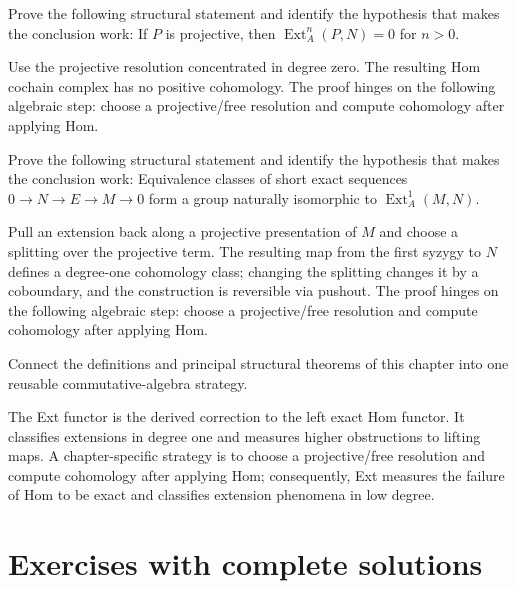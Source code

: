 \begin{problem}\label{prob:v27-problem-10}
Prove the following structural statement and identify the hypothesis that makes the conclusion work: If $P$ is projective, then $\operatorname{Ext}_A^n(P,N)=0$ for $n>0$.
\end{problem}
\begin{solution}
Use the projective resolution concentrated in degree zero. The resulting Hom cochain complex has no positive cohomology. The proof hinges on the following algebraic step: choose a projective/free resolution and compute cohomology after applying Hom.
\end{solution}

\begin{problem}\label{prob:v27-problem-11}
Prove the following structural statement and identify the hypothesis that makes the conclusion work: Equivalence classes of short exact sequences $0\to N\to E\to M\to0$ form a group naturally isomorphic to $\operatorname{Ext}_A^1(M,N)$.
\end{problem}
\begin{solution}
Pull an extension back along a projective presentation of $M$ and choose a splitting over the projective term. The resulting map from the first syzygy to $N$ defines a degree-one cohomology class; changing the splitting changes it by a coboundary, and the construction is reversible via pushout. The proof hinges on the following algebraic step: choose a projective/free resolution and compute cohomology after applying Hom.
\end{solution}

\begin{problem}\label{prob:v27-problem-12}
Connect the definitions and principal structural theorems of this chapter into one reusable commutative-algebra strategy.
\end{problem}
\begin{solution}
The Ext functor is the derived correction to the left exact Hom functor. It classifies extensions in degree one and measures higher obstructions to lifting maps. A chapter-specific strategy is to choose a projective/free resolution and compute cohomology after applying Hom; consequently, Ext measures the failure of Hom to be exact and classifies extension phenomena in low degree.
\end{solution}

\section{Exercises with complete solutions}

